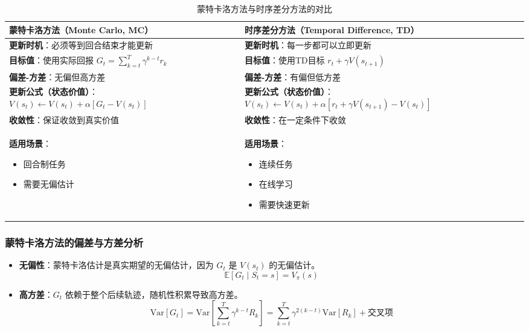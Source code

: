 \begin{table}[H]
\centering
\caption{蒙特卡洛方法与时序差分方法的对比}
\begin{tabular}{p{}p{}}
\toprule
\textbf{蒙特卡洛方法（Monte Carlo, MC）} & \textbf{时序差分方法（Temporal Difference, TD）} \\
\midrule
\textbf{更新时机}：必须等到回合结束才能更新 & \textbf{更新时机}：每一步都可以立即更新 \\
\hline
\textbf{目标值}：使用实际回报 $G_t = \sum_{k=t}^T \gamma^{k-t} r_k$ & \textbf{目标值}：使用TD目标 $r_t + \gamma V(s_{t+1})$ \\
\hline
\textbf{偏差-方差}：无偏但高方差 & \textbf{偏差-方差}：有偏但低方差 \\
\hline
\textbf{更新公式（状态价值）}：
$V(s_t) \leftarrow V(s_t) + \alpha [G_t - V(s_t)]$ & \textbf{更新公式（状态价值）}：
$V(s_t) \leftarrow V(s_t) + \alpha [r_t + \gamma V(s_{t+1}) - V(s_t)]$ \\
\hline
\textbf{收敛性}：保证收敛到真实价值 & \textbf{收敛性}：在一定条件下收敛 \\
\hline
\textbf{适用场景}：
\begin{itemize}
    \item 回合制任务
    \item 需要无偏估计
\end{itemize} & \textbf{适用场景}：
\begin{itemize}
    \item 连续任务
    \item 在线学习
    \item 需要快速更新
\end{itemize} \\
\bottomrule
\end{tabular}
\end{table}

\subsubsection{蒙特卡洛方法的偏差与方差分析}
\begin{itemize}
    \item \textbf{无偏性}：蒙特卡洛估计是真实期望的无偏估计，因为 $G_t$ 是 $V(s_t)$ 的无偏估计。
    \[
    \mathbb{E}[G_t \mid S_t = s] = V_\pi(s)
    \]
    
    \item \textbf{高方差}：$G_t$ 依赖于整个后续轨迹，随机性积累导致高方差。
    \[
    \text{Var}[G_t] = \text{Var}\left[\sum_{k=t}^T \gamma^{k-t} R_k\right] = \sum_{k=t}^T \gamma^{2(k-t)} \text{Var}[R_k] + \text{交叉项}
    \]
\end{itemize}

